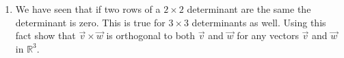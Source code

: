 \begin{enumerate}
\item  We have seen that if two rows of a $2 \times 2$ determinant are the same the determinant is zero.  This is true for $3 \times 3$ determinants as well.  Using this fact show that $\vec{v} \times \vec{w}$ is orthogonal to both $\vec{v}$ and $\vec{w}$ for any vectors $\vec{v}$ and $\vec{w}$ in $\mathbb{R}^3$.
\end{enumerate}

